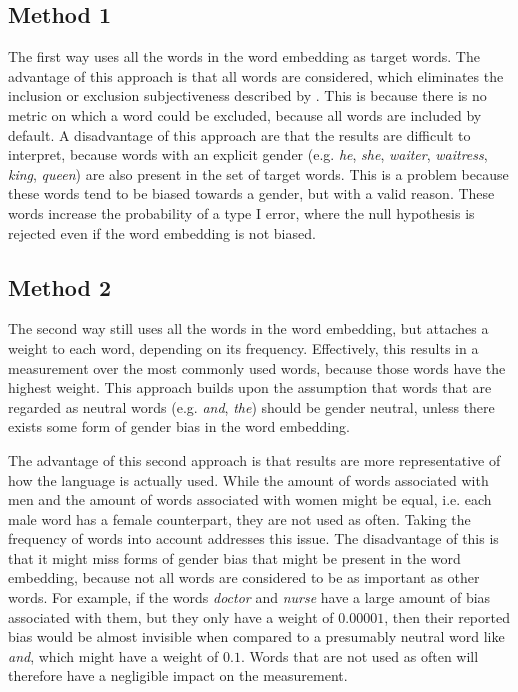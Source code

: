 \subsection{Method 1}
The first way uses
all the words in the word embedding as target words. The advantage of this approach is
that all words are considered, which eliminates the inclusion or exclusion subjectiveness
described by \textcite{nissim_fair_is_better_2020}.  This is because there is no metric
on which a word could be excluded, because all words are included by default.
A disadvantage of this approach
are that the results are difficult to interpret, because words with an explicit
gender (e.g. \textit{he}, \textit{she}, \textit{waiter}, \textit{waitress},
\textit{king}, \textit{queen}) are also
present in the set of target words. This is a problem because these words tend to be biased
towards a gender, but with a valid reason. These words increase the probability of a
type I error, where the null hypothesis is rejected even if the word embedding is not
biased.

\subsection{Method 2}
The second way still uses all the words in the word embedding, but attaches a weight to
each word, depending on its frequency. Effectively, this results in a measurement over
the most commonly used words, because those words have the highest weight.
This approach builds upon the assumption that words that are regarded as neutral words
(e.g. \textit{and}, \textit{the}) should be gender neutral, unless there exists some form
of gender bias in the word embedding.

The advantage of this second approach is that results are more representative of how
the language is actually used. While the amount of words associated with men and the
amount of words associated with women might be equal, i.e. each male word has a female
counterpart, they are not used as often.
Taking the frequency of words into account addresses this issue. 
The disadvantage of this is that
it might miss forms of gender bias that might be present in the word embedding, because
not all words are considered to be as important as other words. For example, if the words
\textit{doctor} and \textit{nurse} have a large amount of bias associated with them,
but they only have a weight of $0.00001$, then their reported bias would be almost
invisible when compared to a presumably neutral word like \textit{and}, which might have
a weight of $0.1$. Words that are not used as often will therefore have a negligible impact
on the measurement.

